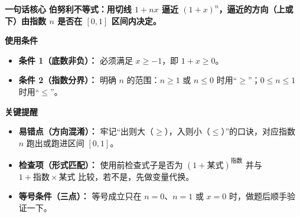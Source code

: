 \begin{summarybox}
\textbf{\textcolor{CSummary}{一句话核心}}
\textbf{伯努利不等式：用切线 $1+nx$ 逼近 $(1+x)^n$，逼近的方向（上或下）由指数 $n$ 是否在 $[0,1]$ 区间内决定。}

\medskip
\textbf{\textcolor{CSummary}{使用条件}}
\begin{itemize}[leftmargin=*, itemsep=0.5em, topsep=0.4em]
    \item \textbf{条件 1（底数非负）：} 必须满足 $x \geq -1$，即 $1+x \geq 0$。
    \item \textbf{条件 2（指数分界）：} 明确 $n$ 的范围：$n \geq 1$ 或 $n \leq 0$ 时用“$\geq$”；$0 \leq n \leq 1$ 时用“$\leq$”。
\end{itemize}

\medskip
\textbf{\textcolor{CSummary}{关键提醒}}
\begin{itemize}[leftmargin=*, itemsep=0.5em, topsep=0.4em]
    \item \textbf{易错点（方向混淆）：} 牢记“出则大（$\geq$），入则小（$\leq$）”的口诀，对应指数 $n$ 跑出或跑进区间 $[0,1]$。
    \item \textbf{检查项（形式匹配）：} 使用前检查式子是否为 $(1+\text{某式})^{\text{指数}}$ 并与 $1+\text{指数} \times \text{某式}$ 比较，若不是，先做变量代换。
    \item \textbf{等号条件（三点）：} 等号成立只在 $n=0$、$n=1$ 或 $x=0$ 时，做题后顺手验证一下。
\end{itemize}
\end{summarybox}
